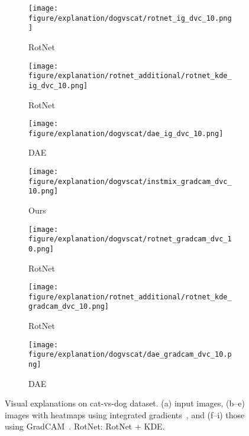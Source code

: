 \documentclass{article} \usepackage{iclr2021_conference,times}
\begin{document}
\begin{figure}[h!]
\begin{subfigure}{.11\textwidth}
  \centering
  \texttt{[image: figure/explanation/dogvscat/rotnet\_ig\_dvc\_10.png]}
  \caption{RotNet}
\end{subfigure}
\hspace{-2mm}
\begin{subfigure}{.11\textwidth}
  \centering
  \texttt{[image: figure/explanation/rotnet\_additional/rotnet\_kde\_ig\_dvc\_10.png]}
  \caption{RotNet}
\end{subfigure}
\hspace{-2mm}
\begin{subfigure}{.11\textwidth}
  \centering
  \texttt{[image: figure/explanation/dogvscat/dae\_ig\_dvc\_10.png]}
  \caption{DAE}
\end{subfigure}
\hspace{-2mm}
\begin{subfigure}{.11\textwidth}
  \centering
  \texttt{[image: figure/explanation/dogvscat/instmix\_gradcam\_dvc\_10.png]}
  \caption{Ours}
\end{subfigure}
\hspace{-2mm}
\begin{subfigure}{.11\textwidth}
  \centering
  \texttt{[image: figure/explanation/dogvscat/rotnet\_gradcam\_dvc\_10.png]}
  \caption{RotNet}
\end{subfigure}
\hspace{-2mm}
\begin{subfigure}{.11\textwidth}
  \centering
  \texttt{[image: figure/explanation/rotnet\_additional/rotnet\_kde\_gradcam\_dvc\_10.png]}
  \caption{RotNet}
\end{subfigure}
\hspace{-2mm}
\begin{subfigure}{.11\textwidth}
  \centering
  \texttt{[image: figure/explanation/dogvscat/dae\_gradcam\_dvc\_10.png]}
  \caption{DAE}
\end{subfigure}
\caption{Visual explanations on cat-vs-dog dataset. (a) input images, (b--e) images with heatmaps using integrated gradients~\citep{sundararajan2017axiomatic}, and (f--i) those using GradCAM~\citep{selvaraju2017grad}. RotNet: RotNet + KDE.}
\label{fig:visual_explanation_cvd_1}
\end{figure}
\end{document}
